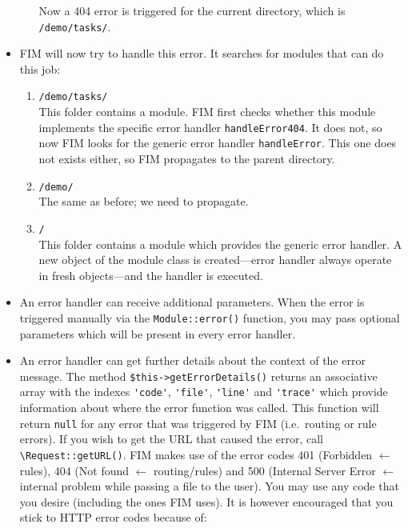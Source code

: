 \documentclass{scrartcl}
\begin{document}
\begin{itemize}
\begin{enumerate}
                  Now a 404 error is triggered for the current directory, which is {\color{nbGreen}\texttt{/demo/tasks/}}.
            \end{enumerate}
         \item
            FIM will now try to handle this error. It searches for modules that can do this job:
            \begin{enumerate}
               \item {\color{nbGreen}\texttt{/demo/tasks/}} \\
                  This folder contains a module. FIM first checks whether this module implements the specific error handler \lstinline!handleError404!. It does not, so now FIM looks for the generic error handler \lstinline!handleError!. This one does not exists either, so FIM propagates to the parent directory.
               \item {\color{nbGreen}\texttt{/demo/}} \\
                  The same as before; we need to propagate.
               \item {\color{nbGreen}\texttt{/}} \\
                  This folder contains a module which provides the generic error handler. A new object of the module class is created---error handler always operate in fresh objects---and the handler is executed.
            \end{enumerate}
         \item
            An error handler can receive additional parameters. When the error is triggered manually via the \lstinline!Module::error()! function, you may pass optional parameters which will be present in every error handler.
         \item
            An error handler can get further details about the context of the error message. The method \lstinline!$this->getErrorDetails()! returns an associative array with the indexes \lstinline!'code'!, \lstinline!'file'!, \lstinline!'line'! and \lstinline!'trace'! which provide information about where the error function was called. This function will return \lstinline!null! for any error that was triggered by FIM (i.e.\ routing or rule errors). If you wish to get the URL that caused the error, call \lstinline!\Request::getURL()!. FIM makes use of the error codes 401 (Forbidden $\leftarrow$ rules), 404 (Not found $\leftarrow$ routing/rules) and 500 (Internal Server Error $\leftarrow$ internal problem while passing a file to the user). You may use any code that you desire (including the ones FIM uses). It is however encouraged that you stick to HTTP error codes because of:

\end{itemize}
\end{document}
